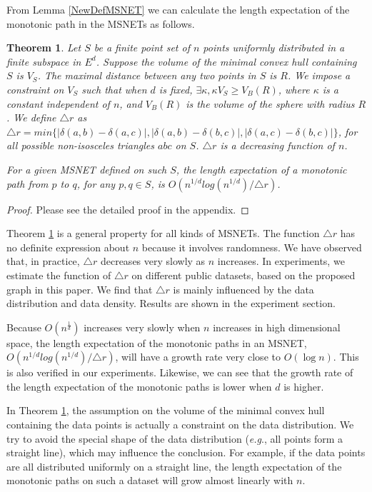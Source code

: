\documentclass{vldb}
\newtheorem{theorem}{Theorem}
\def\eg {\emph{e.g}.} \def\Eg{\emph{E.g}.}
\begin{document}
From Lemma \ref{NewDefMSNET} we can calculate the length expectation of the monotonic path in the MSNETs as follows. 
\begin{theorem}
\label{MSNETPathLength}
Let $S$ be a finite point set of $n$ points uniformly distributed in a finite subspace in $E^d$. Suppose the volume of the minimal convex hull containing $S$ is $V_S$. The maximal distance between any two points in $S$ is $R$. We impose a constraint on $V_S$ such that when $d$ is fixed, $\exists{\kappa},  \kappa V_S\ge V_B(R)$, where $\kappa$ is a constant independent of $n$, and $V_B(R)$ is the volume of the sphere with radius $R$. We define $\triangle{r}$ as $\triangle{r} = min\{|\delta(a,b) - \delta(a,c)|, |\delta(a,b) - \delta(b,c)|, |\delta(a,c) - \delta(b,c)| \}$, for all possible non-isosceles triangles $abc$ on $S$. $\triangle{r}$ is a decreasing function of $n$. 



For a given MSNET defined on such $S$, the length expectation of a monotonic path from $p$ to $q$, for any $p,q\in S$, is $O(n^{1/d}log(n^{1/d}) / \triangle{r})$.
\end{theorem}
\begin{proof}
Please see the detailed proof in the appendix.
\end{proof}

Theorem \ref{MSNETPathLength} is a general property for all kinds of MSNETs. The function $\triangle{r}$ has no definite expression about $n$ because it involves randomness. We have observed that, in practice, $\triangle{r}$ decreases very slowly as $n$ increases. In experiments, we estimate the function of $\triangle{r}$ on different public datasets, based on the proposed graph in this paper. We find that $\triangle{r}$ is mainly influenced by the data distribution and data density. Results are shown in the experiment section. 

Because $O(n^{\frac{1}{d}})$ increases very slowly when $n$ increases in high dimensional space, the length expectation of the monotonic paths in an MSNET, $O(n^{1/d}log(n^{1/d}) / \triangle{r})$, will have a growth rate very close to $O(\log n)$. This is also verified in our experiments. Likewise, we can see that the growth rate of the length expectation of the monotonic paths is lower when $d$ is higher.  


In Theorem \ref{MSNETPathLength}, the assumption on the volume of the minimal convex hull containing the data points is actually a constraint on the data distribution. We try to avoid the special shape of the data distribution (\eg, all points form a straight line), which may influence the conclusion. For example, if the data points are all distributed uniformly on a straight line, the length expectation of the monotonic paths on such a dataset will grow almost linearly with $n$. 
\end{document}
